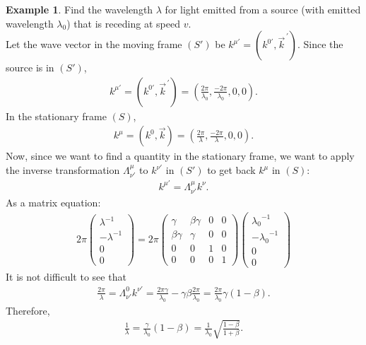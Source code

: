 \documentclass{book}
\theoremstyle{definition}
\newtheorem{exmp}{Example}[section]
\begin{document}
\begin{exmp}
	Find the wavelength $\lambda$ for light emitted from a source (with emitted wavelength $\lambda_0$) that is receding at speed $v$.\\
	
	Let the wave vector in the moving frame $(S')$ be $k^{\mu'} = \left(k^{0'}, \vec{k}^{\,'} \right) $. Since the source is in $(S')$, 
	\begin{align*}
	k^{\mu'} = \left(k^{0'}, \vec{k}^{\,'} \right) = \left( \frac{2\pi}{\lambda_0}, \frac{-2\pi}{\lambda_0},0,0 \right).
	\end{align*}
	In the stationary frame $(S)$, 
	\begin{align*}
	k^\mu = \left( k^0, \vec{k} \right) =  \left( \frac{2\pi}{\lambda}, \frac{-2\pi}{\lambda},0,0 \right).
	\end{align*} 	
	Now, since we want to find a quantity in the stationary frame, we want to apply the inverse transformation $\Lambda^{\mu}_{\nu'}$ to $k^{\nu'}$ in $(S')$ to get back $k^\mu$ in $(S)$:
	\begin{align*}
	k^{\mu'} = \Lambda^{\mu}_{\nu'} k^\nu.
	\end{align*}
	As a matrix equation:
	\begin{align*}
	2\pi\begin{pmatrix}
	\lambda^{-1}\\ -\lambda^{-1}\\0\\0
	\end{pmatrix}
	=
	2\pi\begin{pmatrix}
	\gamma & \beta\gamma & 0 & 0\\
	\beta\gamma & \gamma & 0 & 0\\
	0 & 0 & 1 & 0\\
	0 & 0 & 0 & 1
	\end{pmatrix}
	\begin{pmatrix}
	{\lambda_0}^{-1}\\ -{\lambda_0}^{-1}\\0\\0
	\end{pmatrix}
	\end{align*}
	It is not difficult to see that
	\begin{align*}
	\frac{2\pi}{\lambda} = \Lambda^0_{\nu'}k^{\nu'} = \frac{2\pi\gamma}{\lambda_0} - \gamma\beta\frac{2\pi}{\lambda_0} = \frac{2\pi}{\lambda_0}\gamma(1-\beta).
	\end{align*}
	Therefore,
	\begin{align*}
	\frac{1}{\lambda} = \frac{\gamma}{\lambda_0}(1-\beta) = \frac{1}{\lambda_0}\sqrt{\frac{1-\beta}{1+\beta}}.

\end{align*}
\end{exmp}
\end{document}
